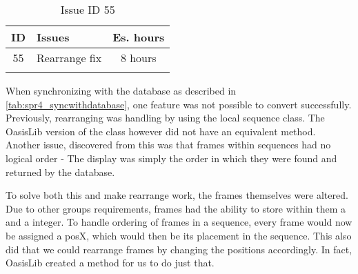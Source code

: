\begin{longtable} { | c | p{12cm} | c | } 
\hline
	ID 	&	Issues	&		 Es. hours \\\hline
	55	&	Rearrange fix	&	8 hours	\\\hline
\caption{Issue ID 55}
\label{tab:spr4_rearrangefix}
\end{longtable}

When synchronizing with the database as described in \ref{tab:spr4_syncwithdatabase}, one feature was not possible to convert successfully. Previously, rearranging was handling by using the local sequence class. The OasisLib version of the class however did not have an equivalent method. Another issue, discovered from this was that frames within sequences had no logical order - The display was simply the order in which they were found and returned by the database.

To solve both this and make rearrange work, the frames themselves were altered. Due to other groups requirements, frames had the ability to store within them a  and a  integer. To handle ordering of frames in a sequence, every frame would now be assigned a posX, which would then be its placement in the sequence. This also did that we could rearrange frames by changing the positions accordingly. In fact, OasisLib created a method for us to do just that.